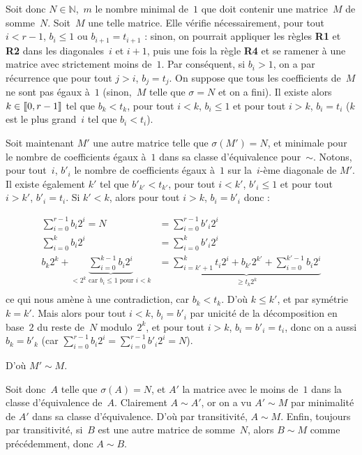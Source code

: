 \documentclass[11pt, openany, a4paper]{article}
\newcommand{\cg }{[\kern-0.15em [}
\newcommand{\cd}{]\kern-0.15em]}
\newcommand{\N}{\mathbb{N}}
\begin{document}
Soit donc $N \in \N$,~$m$ le nombre minimal de~$1$ que doit contenir une matrice~$M$ de somme~$N$. Soit~$M$ une telle matrice. Elle vérifie nécessairement, pour tout $i<r-1$, $b_i \leq 1$ ou $b_{i+1}=t_{i+1}$ : sinon, on pourrait appliquer les règles \textbf{R1} et \textbf{R2} dans les diagonales~$i$ et $i+1$, puis une fois la règle \textbf{R4} et se ramener à une matrice avec strictement moins de~$1$.
Par conséquent, si $b_i > 1$, on a par récurrence que pour tout $j>i$, $b_j = t_j$.
On suppose que tous les coefficients de~$M$ ne sont pas égaux à~$1$ (sinon,~$M$ telle que $\sigma = N$ et on a fini).
Il existe alors $k \in \cg 0, r-1 \cd$ tel que $b_k<t_k$, pour tout  $i<k$, $b_i \leq 1$ et pour tout $i>k$, $b_i=t_i$ ($k$ est le plus grand~$i$ tel que $b_i < t_i$).

Soit maintenant $M'$ une autre matrice telle que $\sigma (M')=N$, et minimale pour le nombre de coefficients égaux à~$1$ dans sa classe d'équivalence pour~$\sim$. Notons, pour tout~$i$, $b'_i$ le nombre de coefficients égaux à~$1$ sur la~$i$-ème diagonale de $M'$. Il existe également $k'$ tel que $b'_{k'} < t_{k'}$, pour tout $i<k'$, $b'_i \leq 1$ et pour tout $i>k'$, $b'_i=t_i$. Si $k'<k$, alors pour tout $i>k$, $b_i= b'_i$ donc : 


\begin{align*}
\sum\limits_{i=0}^{r-1}b_i 2^i = N &= \sum\limits_{i=0}^{r-1}b'_i 2^i\\
\sum\limits_{i=0}^k b_i 2^i &= \sum\limits_{i=0}^k b'_i 2^i\\
b_k 2^k + \underbrace{\sum\limits_{i=0}^{k-1} b_i 2^i}_{\text{$< 2^k$ car $b_i \leq 1$ pour $i<k$}} &=\underbrace{\sum\limits_{i=k'+1}^k t_i 2^i + b_{k'} 2^{k'} + \sum\limits_{i=0}^{k' -1} b_i 2^i}_{\geq t_k 2^k}\\
\end{align*}
ce qui nous amène à une contradiction, car $b_k<t_k$. D'où $k \leq k'$, et par symétrie $k = k'$. Mais alors pour tout $i<k$, $b_i = b'_i$ par unicité de la décomposition en base~$2$ du reste de~$N$ modulo~$2^k$, et pour tout $i>k$, $b_i = b'_i = t_i$, donc on a aussi $b_k = b'_k$ (car $\sum\limits_{i=0}^{r-1} b_i 2^i = \sum\limits_{i=0}^{r-1} b'_i 2^i = N$).

D'où $M' \sim M$. 

Soit donc~$A$ telle que $\sigma(A)=N$, et $A'$ la matrice avec le moins de~$1$ dans la classe d'équi\-valence de~$A$. Clairement $A \sim A'$, or on a vu $A'\sim M$ par minimalité de $A'$ dans sa classe d'équivalence. D'où par transitivité, $A \sim M$. Enfin, toujours par transitivité, si~$B$ est une autre matrice de somme~$N$, alors $B \sim M$ comme précédemment, donc $A \sim B$.
\end{document}
